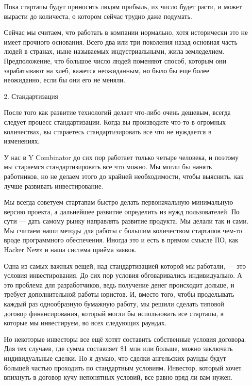 \documentclass[ebook,12pt,oneside,openany]{memoir}
\begin{document}
Пока стартапы будут приносить людям прибыль, их число будет расти, и
может вырасти до количеста, о котором сейчас трудно даже подумать.

Сейчас мы считаем, что работать в компании нормально, хотя исторически
это не имеет прочного основания. Всего два или три поколения назад
основная часть людей в странах, ныне называемых индустриальными, жила
земледелием. Предположение, что большое число людей поменяют способ,
которым они зарабатывают на хлеб, кажется неожиданным, но было бы еще
более неожиданно, если бы они его не меняли.

2. Стандартизация

После того как развитие технологий делает что-либо очень дешевым,
всегда следует процесс стандартизации. Когда вы производите что-то в
огромных количествах, вы стараетесь стандартизировать все что не
нуждается в изменениях.

У нас в Y Combinator до сих пор работает только четыре человека, и
поэтому мы стараемся стандартизировать все что можно. Мы могли бы
нанять работников, но не делаем этого до крайней необходимости, чтобы
выяснить, как лучше развивать инвестирование.

Мы всегда советуем стартапам быстро делать первоначальную минимальную
версию проекта, а дальнейшее развитие определить из нужд
пользователей. По сути — дать самому рынку направлять развитие
продукта. Мы делали так и сами. Мы считаем наши методы для работы с
большим количеством стартапов чем-то вроде программного обеспечения.
Иногда это и есть в прямом смысле ПО, как Hacker News и наша система
приёма заявок.

Одна из самых важных вещей, над стандартизацией которой мы работали, —
это условия инвестирования. До сих пор условия обговаривались
индивидуально. А это проблема для разработчиков, ведь получение денег
происходит дольше, и требует дополнительной работы юристов. И, вместо
того, чтобы проделывать каждый раз однообразную бумажную работу, мы
решили сделать типовой договор финансирования, который могли бы
использовать все стартапы, в которые мы инвестируем, во всех следующих
раундах.

Но некоторые инвесторы все ещё хотят составить собственные условия
договора. Для тех случаев, где сумма составляет \$1 млн или больше,
можно заключать индивидуальные сделки. Но я думаю, что сделки
ангельских раунды будут большей частью проходить по стандартным
условиям. Инвестор, который хочет впихнуть в договор кучу непонятных
условий, все равно вряд ли вам нужен.
\end{document}
